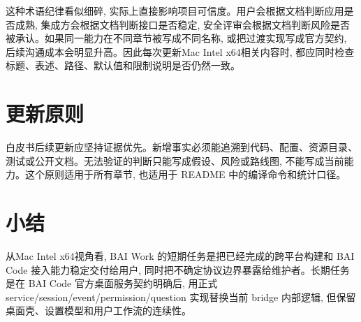 这种术语纪律看似细碎, 实际上直接影响项目可信度。用户会根据文档判断应用是否成熟, 集成方会根据文档判断接口是否稳定, 安全评审会根据文档判断风险是否被承认。如果同一能力在不同章节被写成不同名称, 或把过渡实现写成官方契约, 后续沟通成本会明显升高。因此每次更新Mac Intel x64相关内容时, 都应同时检查标题、表述、路径、默认值和限制说明是否仍然一致。

\section{更新原则}
白皮书后续更新应坚持证据优先。新增事实必须能追溯到代码、配置、资源目录、测试或公开文档。无法验证的判断只能写成假设、风险或路线图, 不能写成当前能力。这个原则适用于所有章节, 也适用于 README 中的编译命令和统计口径。

\section{小结}
从Mac Intel x64视角看, BAI Work 的短期任务是把已经完成的跨平台构建和 BAI Code 接入能力稳定交付给用户, 同时把不确定协议边界暴露给维护者。长期任务是在 BAI Code 官方桌面服务契约明确后, 用正式 service/session/event/permission/question 实现替换当前 bridge 内部逻辑, 但保留桌面壳、设置模型和用户工作流的连续性。
